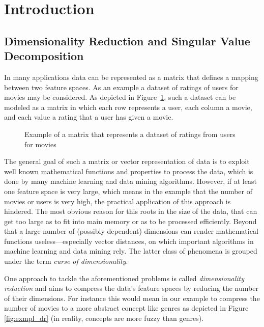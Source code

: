 \section{Introduction}

\subsection{Dimensionality Reduction and Singular Value Decomposition}

In many applications data can be represented as a matrix that defines a mapping
between two feature spaces. As an example a dataset of ratings of users for
movies may be considered. As depicted in Figure~\ref{fig:exmpl_matrix}, such a
dataset can be modeled as a matrix in which each row represents a user, each
column a movie, and each value a rating that a user has given a movie.

\begin{figure}[h]
\centering
{}
\caption{Example of a matrix that represents a dataset of ratings from users
for movies}
\label{fig:exmpl_matrix}
\end{figure}

The general goal of such a matrix or vector representation of data is to
exploit well known mathematical functions and properties to process the data,
which is done by many machine learning and data mining algorithms. However, if
at least one feature space is very large, which means in the example that the
number of movies or users is very high, the practical application of this
approach is hindered. The most obvious reason for this roots in the size of the
data, that can get too large as to fit into main memory or as to be processed
efficiently. Beyond that a large number of (possibly dependent) dimensions can
render mathematical functions useless---especially vector distances, on which
important algorithms in machine learning and data mining rely. The latter class
of phenomena is grouped under the term \textsl{curse of dimensionality}.

One approach to tackle the aforementioned problems is called
\textsl{dimensionality reduction} and aims to compress the data's feature
spaces by reducing the number of their dimensions. For instance this would mean
in our example to compress the number of movies to a more abstract concept like
genres as depicted in Figure \ref{fig:exmpl_dr} (in reality, concepts are more
fuzzy than genres).

